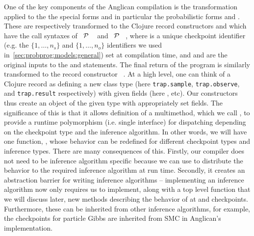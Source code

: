 One of the key components of the Anglican compilation is the transformation applied to the
the special forms and in particular the probabilistic forms \sample and \observe.  These
are respectively transformed to the Clojure record constructors \samplecps and \observecps 
which have the call syntaxes of
 ~$\mathcal{P}$ ~\angstate\clj{)} and  ~$\mathcal{P}$ ~\angstate\clj{)},
where  is a unique checkpoint identifier (e.g. the $\{1,\dots,n_s\}$ and $\{1,\dots,n_o\}$ identifiers
we used in~\ref{sec:probprog:models:general}) set at compilation time, and   and 
are the original inputs to the \sample and \observe statements.  
The final return of the program is similarly transformed to the record constructor
~\angstate\clj{)}.
At a high level, one can
think of a Clojure record as defining a new class type (here {\small \texttt{trap.sample}}, {\small \texttt{trap.observe}},
and {\small \texttt{trap.result}} respectively) with given fields (here ,  etc).  Our constructors thus create
an object of the given type with appropriately set fields.  The significance of this is that
it allows definition of a multimethod, which we call \checkpoint, to provide a runtime polymorphism
(i.e. single interface) for dispatching depending on the checkpoint
type and the inference algorithm.  In other words, we will have one function, \checkpoint, whose
behavior can be redefined for different checkpoint types and inference types.  There are many
consequences of this.  Firstly, our compiler does not need to be inference algorithm specific
because we can use \checkpoint to distribute the behavior to the required inference algorithm
at run time.  Secondly, it creates an abstraction barrier for writing inference algorithms -- implementing
an inference algorithm now only requires us to implement, along with a top level function \anginfer that
we will discuss later, new methods describing the behavior of \checkpoint at \sample and \observe
checkpoints.  Furthermore, these can be inherited from other inference algorithms, for example,
the \observe checkpoints for particle Gibbs are inherited from SMC in Anglican's implementation.


